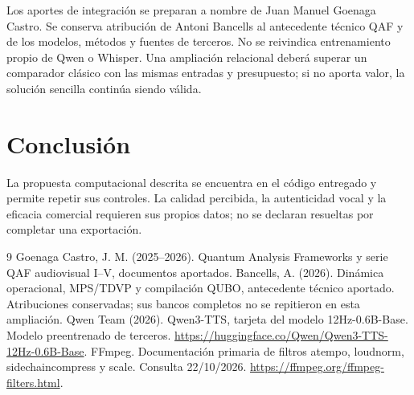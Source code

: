\documentclass[10pt,a4paper]{article}
\begin{document}
Los aportes de integración se preparan a nombre de Juan Manuel Goenaga Castro. Se conserva atribución de Antoni Bancells al antecedente técnico QAF y de los modelos, métodos y fuentes de terceros. No se reivindica entrenamiento propio de Qwen o Whisper. Una ampliación relacional deberá superar un comparador clásico con las mismas entradas y presupuesto; si no aporta valor, la solución sencilla continúa siendo válida.
\section{Conclusión}
La propuesta computacional descrita se encuentra en el código entregado y permite repetir sus controles. La calidad percibida, la autenticidad vocal y la eficacia comercial requieren sus propios datos; no se declaran resueltas por completar una exportación.
\begin{thebibliography}{9}
 Goenaga Castro, J. M. (2025--2026). Quantum Analysis Frameworks y serie QAF audiovisual I--V, documentos aportados. Bancells, A. (2026). Dinámica operacional, MPS/TDVP y compilación QUBO, antecedente técnico aportado. Atribuciones conservadas; sus bancos completos no se repitieron en esta ampliación.
 Qwen Team (2026). Qwen3-TTS, tarjeta del modelo 12Hz-0.6B-Base. Modelo preentrenado de terceros. \url{https://huggingface.co/Qwen/Qwen3-TTS-12Hz-0.6B-Base}.
 FFmpeg. Documentación primaria de filtros atempo, loudnorm, sidechaincompress y scale. Consulta 22/10/2026. \url{https://ffmpeg.org/ffmpeg-filters.html}.
\end{thebibliography}
\end{document}
